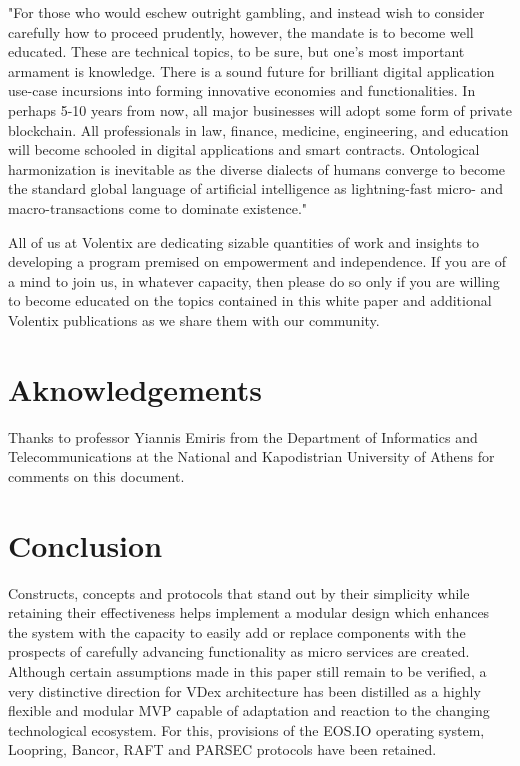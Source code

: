 \documentclass[]{article}
\begin{document}
{	"For those who would eschew outright gambling, and instead wish to consider carefully how to proceed prudently, however, the mandate is to become well educated. These are technical topics, to be sure, but one's most important armament is knowledge. There is a sound future for brilliant digital application use-case incursions into forming innovative economies and functionalities. In perhaps 5-10 years from now, all major businesses will adopt some form of private blockchain. All professionals in law, finance, medicine, engineering, and education will become schooled in digital applications and smart contracts. Ontological harmonization is inevitable as the diverse dialects of humans converge to become the standard global language of artificial intelligence as lightning-fast micro- and macro-transactions come to dominate existence."\cite{26}
	
	All of us at Volentix are dedicating sizable quantities of work and insights to developing a program premised on empowerment and independence. If you are of a mind to join us, in whatever capacity, then please do so only if you are willing to become educated on the topics contained in this white paper and additional Volentix publications as we share them with our community. 
	
	

\paragraph{}
\paragraph{}	

\section{Aknowledgements}
Thanks to professor Yiannis Emiris
from the Department of Informatics and Telecommunications 
at the National and Kapodistrian University of Athens for comments on this document.
	
\section{Conclusion}
Constructs, concepts and protocols that stand out by their simplicity
while retaining their effectiveness helps implement a modular
design which enhances the system with the capacity to easily add or replace components 
with the prospects of carefully advancing functionality as micro services are created.
Although certain assumptions made in this paper still remain to be verified,
a very distinctive direction for VDex architecture has been distilled as a highly flexible and modular MVP 
capable of adaptation and reaction to the changing technological ecosystem.
For this, provisions of the EOS.IO operating system, Loopring, Bancor, RAFT and PARSEC protocols have been retained. 

}
\end{document}
